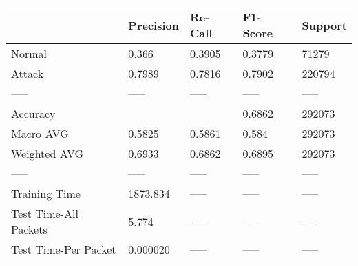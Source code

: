 \begin{tabular}{lllll}
\toprule
{} & Precision & Re-Call & F1-Score & Support \\
\midrule
Normal                &     0.366 &  0.3905 &   0.3779 &   71279 \\
Attack                &    0.7989 &  0.7816 &   0.7902 &  220794 \\
-----                 &     ----- &   ----- &    ----- &   ----- \\
Accuracy              &           &         &   0.6862 &  292073 \\
Macro AVG             &    0.5825 &  0.5861 &    0.584 &  292073 \\
Weighted AVG          &    0.6933 &  0.6862 &   0.6895 &  292073 \\
-----                 &     ----- &   ----- &    ----- &   ----- \\
Training Time         &  1873.834 &   ----- &    ----- &   ----- \\
Test Time-All Packets &     5.774 &   ----- &    ----- &   ----- \\
Test Time-Per Packet  &  0.000020 &   ----- &    ----- &   ----- \\
\bottomrule
\end{tabular}
